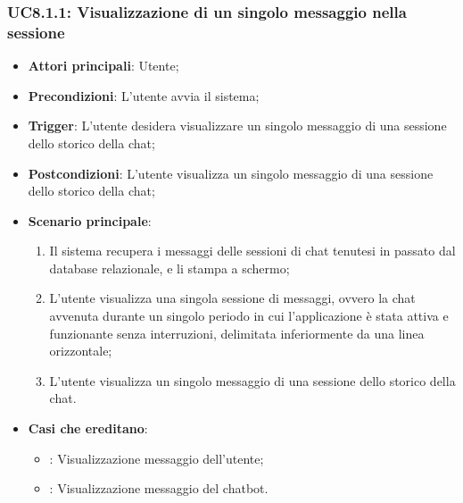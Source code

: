 \subsubsection{UC8.1.1: Visualizzazione di un singolo messaggio nella sessione}
\begin{itemize}
    \item \textbf{Attori principali}: Utente;
    \item \textbf{Precondizioni}: L'utente avvia il sistema;
    \item \textbf{Trigger}: L'utente desidera visualizzare un singolo messaggio di una sessione dello storico della chat;
    \item \textbf{Postcondizioni}: L'utente visualizza un singolo messaggio di una sessione dello storico della chat;
    \item \textbf{Scenario principale}:
    \begin{enumerate}
        \item Il sistema recupera i messaggi delle sessioni di chat tenutesi in passato dal database relazionale, e li stampa a schermo;
        \item L'utente visualizza una singola sessione di messaggi, ovvero la chat avvenuta durante un singolo periodo in cui l'applicazione
        è stata attiva e funzionante senza interruzioni, delimitata inferiormente da una linea orizzontale;
        \item L'utente visualizza un singolo messaggio di una sessione dello storico della chat.
    \end{enumerate}
    \item \textbf{Casi che ereditano}:
    \begin{itemize}
        \item {}: Visualizzazione messaggio dell'utente;
        \item {}: Visualizzazione messaggio del chatbot.
    \end{itemize}
\end{itemize}

\hypertarget{UC8.1.2}{}
